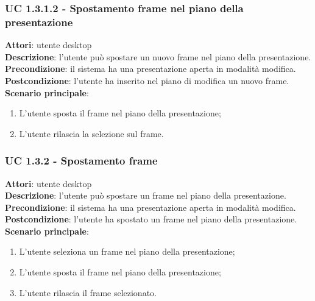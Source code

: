 \subsubsection{UC 1.3.1.2 - Spostamento frame nel piano della presentazione}{
	\label{uc1.3.1.2}
	\textbf{Attori}: utente desktop \\
	\textbf{Descrizione}: l'utente può spostare un nuovo frame nel piano della presentazione. \\
	\textbf{Precondizione}: il sistema ha una presentazione aperta in modalità modifica.	\\
	\textbf{Postcondizione}: l'utente ha inserito nel piano di modifica un nuovo frame.	\\
	\textbf{Scenario principale}:
	\begin{enumerate}
		\item L'utente sposta il frame nel piano della presentazione;
		\item L'utente rilascia la selezione sul frame.
	\end{enumerate}
	}
\subsubsection{UC 1.3.2 - Spostamento frame}{
	\label{uc1.3.2}
	\textbf{Attori}: utente desktop \\
	\textbf{Descrizione}: l'utente può spostare un frame nel piano della presentazione. \\
	\textbf{Precondizione}: il sistema ha una presentazione aperta in modalità modifica.	\\
	\textbf{Postcondizione}: l'utente ha spostato un frame nel piano della presentazione.	\\
	\textbf{Scenario principale}:
	\begin{enumerate}
		\item L'utente seleziona un frame nel piano della presentazione;
		\item L'utente sposta il frame nel piano della presentazione;
		\item L'utente rilascia il frame selezionato.
	\end{enumerate}
	}
